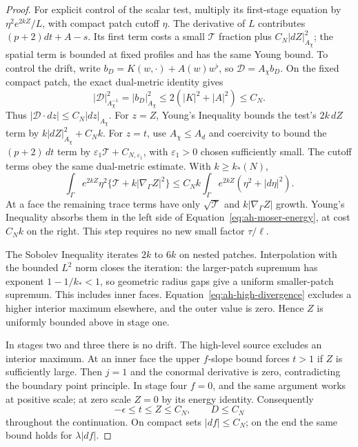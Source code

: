 \begin{proof}
For explicit control of the scalar test, multiply its first-stage
equation by \(\eta^2e^{2kZ}/L\), with compact patch cutoff \(\eta\).
The derivative of \(L\) contributes
\((p+2)dt+A-s\). Its first term costs a small \(\mathcal T\)
fraction plus \(C_N|dZ|_{A_\chi}^2\); the spatial term is bounded
at fixed profiles and has the same Young bound. To control the drift,
write \(b_D=K(w,\cdot)+A(w)w^\flat\), so \(\mathcal D=A_\chi b_D\).
On the fixed compact patch, the exact dual-metric identity gives
\[
 |\mathcal D|_{A_\chi^{-1}}^2=|b_D|_{A_\chi}^2
 \le 2(|K|^2+|A|^2)\le C_N .
\]
Thus \(|\mathcal D\cdot dz|\le C_N|dz|_{A_\chi}\).
For \(z=Z\), Young's Inequality bounds the test's \(2k\,dZ\)
term by \(k|dZ|_{A_\chi}^2+C_Nk\). For \(z=t\), use
\(A_\chi\le A_d\) and coercivity to bound the \((p+2)\,dt\)
term by \(\varepsilon_1\mathcal T+C_{N,\varepsilon_1}\),
with \(\varepsilon_1>0\) chosen sufficiently small.
The cutoff terms obey the same dual-metric estimate.
With \(k\ge k_*(N)\),
\begin{equation}\label{eq:ah-moser-energy}
 \int_\Gamma e^{2kZ}\eta^2
       \{\mathcal T+k|\nabla_\Gamma Z|^2\}
 \le C_Nk\int_\Gamma e^{2kZ}(\eta^2+|d\eta|^2).
\end{equation}
At a face the remaining trace terms have only
\(\sqrt{\mathcal T}\) and \(k|\nabla_\Gamma Z|\) growth.
Young's Inequality absorbs them in the left side of
Equation~\eqref{eq:ah-moser-energy}, at cost \(C_Nk\) on the right.
This step requires no new small factor \(\tau/\ell\).

The Sobolev Inequality iterates \(2k\) to \(6k\) on nested patches.
Interpolation with the bounded \(L^2\) norm closes the iteration:
the larger-patch supremum has exponent \(1-1/k_*<1\), so geometric
radius gaps give a uniform smaller-patch supremum. This includes
inner faces. Equation~\eqref{eq:ah-high-divergence} excludes a
higher interior maximum elsewhere, and the outer value is zero.
Hence \(Z\) is uniformly bounded above in stage one.

In stages two and three there is no drift. The high-level source
excludes an interior maximum. At an inner face the upper \(f\)-slope
bound forces \(t>1\) if \(Z\) is sufficiently large. Then \(j=1\)
and the conormal derivative is zero, contradicting the boundary
point principle. In stage four \(f=0\), and the same argument works at
positive scale; at zero scale \(Z=0\) by its energy identity.
Consequently
\[
 -\epsilon\le t\le Z\le C_N,\qquad D\le C_N
\]
throughout the continuation. On compact sets \(|df|\le C_N\);
on the end the same bound holds for \(\lambda|df|\).


\end{proof}
